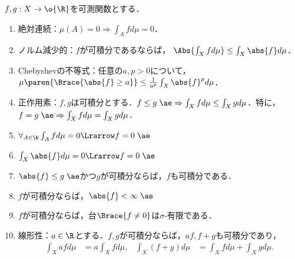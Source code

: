 \documentclass[uplatex, dvipdfmx]{jsreport}
\begin{document}
\begin{theorem}\label{thm-properties-of-integral}
    $f,g:X\to\o{\R}$を可測関数とする．
    \begin{enumerate}
        \item 絶対連続：$\mu(A)=0\Rightarrow\int_Afd\mu=0$．
        \item ノルム減少的：$f$が可積分であるならば，
        $\Abs{\int_Xfd\mu}\le\int_X\abs{f}d\mu$．
        \item Chebyshevの不等式：任意の$a,p>0$について，$\mu\paren{\Brace{\abs{f}\ge a}}\le\frac{1}{a^p}\int_X\abs{f}^pd\mu$．
        \item 正作用素：$f,g$は可積分とする．$f\le g\;\ae\Rightarrow\int_X fd\mu\le\int_Xgd\mu$．特に，$f= g\;\ae\Rightarrow\int_X fd\mu=\int_Xgd\mu$．
        \item $\forall_{A\in\B}\int_Afd\mu=0\Lrarrow f=0\;\ae$
        \item $\int_X\abs{f}d\mu=0\Lrarrow f=0\;\ae$
        \item $\abs{f}\le g\;\ae$かつ$g$が可積分ならば，$f$も可積分である．
        \item $f$が可積分ならば，$\abs{f}<\infty\;\ae$
        \item $f$が可積分ならば，台$\Brace{f\ne0}$は$\sigma$-有限である．
        \item 線形性：$a\in\R$とする．$f,g$が可積分ならば，$af,f+g$も可積分であり，
        \begin{align*}
            \int_Xafd\mu&=a\int_Xfd\mu,&\int_X(f+g)d\mu&=\int_Xfd\mu+\int_Xgd\mu.
        \end{align*}
    \end{enumerate}
\end{theorem}
\end{document}
